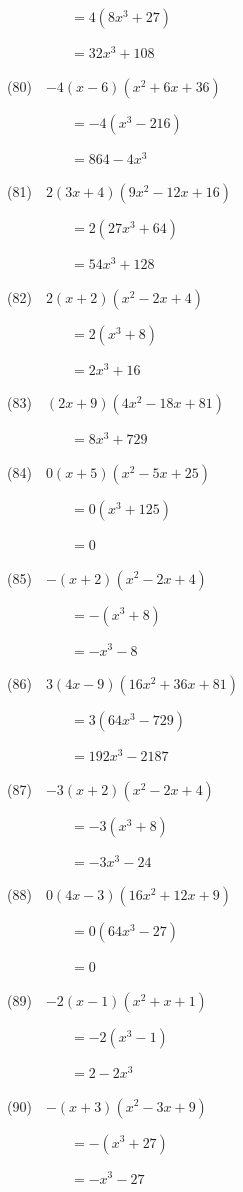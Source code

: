 \documentclass[a4j,twocolumn,10pt,fleqn]{jarticle}
\begin{document}
~~~~~~~~~$=4(8 x^{3} + 27)$

~~~~~~~~~$=32 x^{3} + 108$

(80)~~$-4\left(x - 6\right) \left(x^{2} + 6 x + 36\right)$

~~~~~~~~~$=-4(x^{3} - 216)$

~~~~~~~~~$=864 - 4 x^{3}$

(81)~~$2\left(3 x + 4\right) \left(9 x^{2} - 12 x + 16\right)$

~~~~~~~~~$=2(27 x^{3} + 64)$

~~~~~~~~~$=54 x^{3} + 128$

(82)~~$2\left(x + 2\right) \left(x^{2} - 2 x + 4\right)$

~~~~~~~~~$=2(x^{3} + 8)$

~~~~~~~~~$=2 x^{3} + 16$

(83)~~$\left(2 x + 9\right) \left(4 x^{2} - 18 x + 81\right)$

~~~~~~~~~$=8 x^{3} + 729$

(84)~~$0\left(x + 5\right) \left(x^{2} - 5 x + 25\right)$

~~~~~~~~~$=0(x^{3} + 125)$

~~~~~~~~~$=0$

(85)~~$-\left(x + 2\right) \left(x^{2} - 2 x + 4\right)$

~~~~~~~~~$=-(x^{3} + 8)$

~~~~~~~~~$=- x^{3} - 8$

(86)~~$3\left(4 x - 9\right) \left(16 x^{2} + 36 x + 81\right)$

~~~~~~~~~$=3(64 x^{3} - 729)$

~~~~~~~~~$=192 x^{3} - 2187$

(87)~~$-3\left(x + 2\right) \left(x^{2} - 2 x + 4\right)$

~~~~~~~~~$=-3(x^{3} + 8)$

~~~~~~~~~$=- 3 x^{3} - 24$

(88)~~$0\left(4 x - 3\right) \left(16 x^{2} + 12 x + 9\right)$

~~~~~~~~~$=0(64 x^{3} - 27)$

~~~~~~~~~$=0$

(89)~~$-2\left(x - 1\right) \left(x^{2} + x + 1\right)$

~~~~~~~~~$=-2(x^{3} - 1)$

~~~~~~~~~$=2 - 2 x^{3}$

(90)~~$-\left(x + 3\right) \left(x^{2} - 3 x + 9\right)$

~~~~~~~~~$=-(x^{3} + 27)$

~~~~~~~~~$=- x^{3} - 27$
\end{document}
